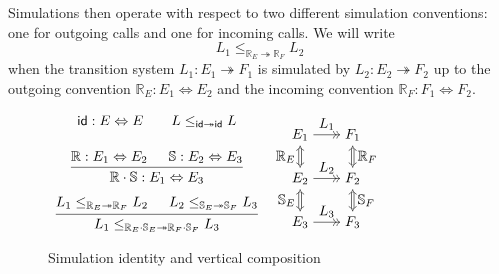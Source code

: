 \documentclass[sigplan,10pt,review,anonymous]{acmart}
\newcommand{\kw}[1]{\ensuremath{ \mathsf{#1} }}
\begin{document}
Simulations then operate with respect to
two different simulation conventions:
one for outgoing calls and one for incoming calls.
We will write
\[
  L_1 \le_{\mathbb{R}_E \twoheadrightarrow \mathbb{R}_F} L_2
\]
when the transition system
$L_1 : E_1 \twoheadrightarrow F_1$
is simulated by
$L_2 : E_2 \twoheadrightarrow F_2$
up to the outgoing convention
$\mathbb{R}_E : E_1 \Leftrightarrow E_2$
and the incoming convention
$\mathbb{R}_F : F_1 \Leftrightarrow F_2$.

\begin{figure} %
  $\begin{array}{c}
    \kw{id} : E \Leftrightarrow E
    \qquad
    L \le_{\kw{id} \twoheadrightarrow \kw{id}} L
    \\[1.5em]
   {\begin{prooftree}
    \hypo{\mathbb{R} : E_1 \Leftrightarrow E_2}
    \hypo{\mathbb{S} : E_2 \Leftrightarrow E_3}
    \infer2{\mathbb{R} \cdot \mathbb{S} : E_1 \Leftrightarrow E_3}
    \end{prooftree}}
    \\[1.5em]
   {\begin{prooftree}
    \hypo{L_1 \le_{\mathbb{R}_E \twoheadrightarrow \mathbb{R}_F} L_2}
    \hypo{L_2 \le_{\mathbb{S}_E \twoheadrightarrow \mathbb{S}_F} L_3}
    \infer2{
      L_1 \le_{\mathbb{R}_E \cdot \mathbb{S}_E \twoheadrightarrow
               \mathbb{R}_F \cdot \mathbb{S}_F} L_3}
    \end{prooftree}}
  \end{array}
  \:\:
  \begin{tikzpicture}[baseline=0.6mm,xscale=0.66,yscale=0.55]
    \node (A1) at (-1,  2) {$E_1$};
    \node (A2) at (-1,  0) {$E_2$};
    \node (A3) at (-1, -2) {$E_3$};
    \node (B1) at ( 1,  2) {$F_1$};
    \node (B2) at ( 1,  0) {$F_2$};
    \node (B3) at ( 1, -2) {$F_3$};
    \draw (A1) edge[->>] node[auto] {$L_1$} (B1);
    \draw (A2) edge[->>] node[auto] {$L_2$} (B2);
    \draw (A3) edge[->>] node[auto] {$L_3$} (B3);
    \begin{scope}[double equal sign distance, {Implies[]}-{Implies[]}]
      \draw (A1) edge[double] node[auto,swap] {$\mathbb{R}_E$} (A2);
      \draw (B1) edge[double] node[auto] {$\mathbb{R}_F$} (B2);
      \draw (A2) edge[double] node[auto,swap] {$\mathbb{S}_E$} (A3);
      \draw (B2) edge[double] node[auto] {$\mathbb{S}_F$} (B3);
    \end{scope}
  \end{tikzpicture}
  $
  \caption{Simulation identity and vertical composition}
  \label{fig:simcomp}
\end{figure}
\end{document}

